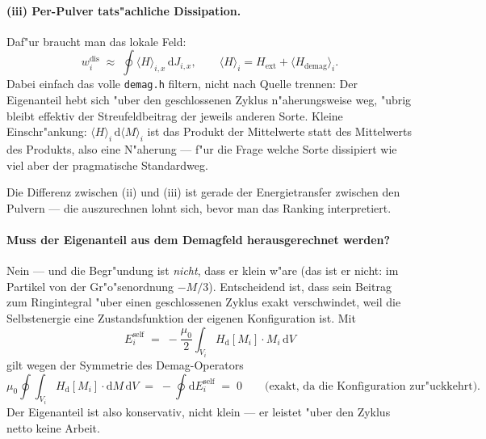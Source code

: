 \documentclass[11pt,a4paper]{article}
\begin{document}
\paragraph{(iii) Per-Pulver tats"achliche Dissipation.} Daf"ur braucht man das lokale Feld:
\begin{equation}
w_i^\text{dis} \;\approx\; \oint \langle H \rangle_{i,x} \, \mathrm{d}J_{i,x} ,
\qquad
\langle H \rangle_i = H_\text{ext} + \langle H_\text{demag} \rangle_i .
\end{equation}
Dabei einfach das volle \texttt{demag.h} filtern, nicht nach Quelle trennen: Der Eigenanteil hebt sich "uber den geschlossenen Zyklus n"aherungsweise weg, "ubrig bleibt effektiv der Streufeldbeitrag der jeweils anderen Sorte. Kleine Einschr"ankung: $\langle H \rangle_i \, \mathrm{d}\langle M \rangle_i$ ist das Produkt der Mittelwerte statt des Mittelwerts des Produkts, also eine N"aherung --- f"ur die Frage \glqq welche Sorte dissipiert wie viel\grqq{} aber der pragmatische Standardweg.

Die Differenz zwischen (ii) und (iii) ist gerade der Energietransfer zwischen den Pulvern --- die auszurechnen lohnt sich, bevor man das Ranking interpretiert.

\paragraph{Muss der Eigenanteil aus dem Demagfeld herausgerechnet werden?}
Nein --- und die Begr"undung ist \emph{nicht}, dass er klein w"are (das ist er nicht: im Partikel von der Gr"o"senordnung $-M/3$). Entscheidend ist, dass sein Beitrag zum Ringintegral "uber einen geschlossenen Zyklus exakt verschwindet, weil die Selbstenergie eine Zustandsfunktion der eigenen Konfiguration ist. Mit
\begin{equation}
E_i^\text{self} \;=\; -\frac{\mu_0}{2} \int_{V_i} H_\mathrm{d}[M_i] \cdot M_i \,\mathrm{d}V
\end{equation}
gilt wegen der Symmetrie des Demag-Operators
\begin{equation}
\mu_0 \oint \int_{V_i} H_\mathrm{d}[M_i] \cdot \mathrm{d}M \,\mathrm{d}V
\;=\; -\oint \mathrm{d}E_i^\text{self} \;=\; 0
\qquad \text{(exakt, da die Konfiguration zur"uckkehrt).}
\end{equation}
Der Eigenanteil ist also konservativ, nicht klein --- er leistet "uber den Zyklus netto keine Arbeit.
\end{document}
